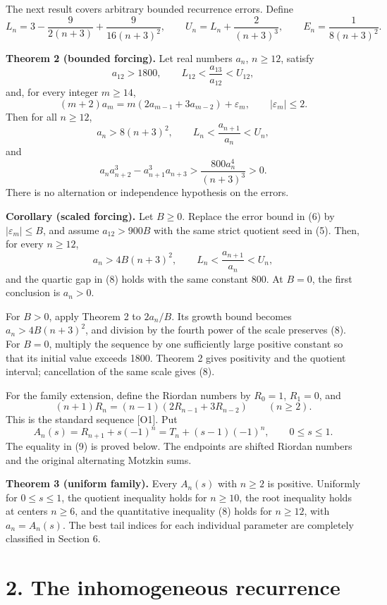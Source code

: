 \documentclass[
  11pt,
  a4paper,
]{article}
\begin{document}
The next result covers arbitrary bounded recurrence errors. Define \[
L_n=3-\frac9{2(n+3)}+\frac9{16(n+3)^2},\qquad
U_n=L_n+\frac2{(n+3)^3},\qquad E_n=\frac1{8(n+3)^2}.
\tag{4}
\]

\textbf{Theorem 2 (bounded forcing).} Let real numbers \(a_n\),
\(n\ge12\), satisfy \[
a_{12}>1800,\qquad L_{12}<\frac{a_{13}}{a_{12}}<U_{12},
\tag{5}
\] and, for every integer \(m\ge14\), \[
(m+2)a_m=m(2a_{m-1}+3a_{m-2})+\varepsilon_m,
\qquad |\varepsilon_m|\le2.
\tag{6}
\] Then for all \(n\ge12\), \[
a_n>8(n+3)^2,\qquad L_n<\frac{a_{n+1}}{a_n}<U_n,
\tag{7}
\] and \[
a_na_{n+2}^3-a_{n+1}^3a_{n+3}
>\frac{800a_n^4}{(n+3)^3}>0.
\tag{8}
\] There is no alternation or independence hypothesis on the errors.

\textbf{Corollary (scaled forcing).} Let \(B\ge0\). Replace the error
bound in (6) by \(|\varepsilon_m|\le B\), and assume \(a_{12}>900B\)
with the same strict quotient seed in (5). Then, for every \(n\ge12\),
\[
a_n>4B(n+3)^2,\qquad L_n<\frac{a_{n+1}}{a_n}<U_n,
\] and the quartic gap in (8) holds with the same constant 800. At
\(B=0\), the first conclusion is \(a_n>0\).

For \(B>0\), apply Theorem 2 to \(2a_n/B\). Its growth bound becomes
\(a_n>4B(n+3)^2\), and division by the fourth power of the scale
preserves (8). For \(B=0\), multiply the sequence by one sufficiently
large positive constant so that its initial value exceeds 1800. Theorem
2 gives positivity and the quotient interval; cancellation of the same
scale gives (8).

For the family extension, define the Riordan numbers by \(R_0=1\),
\(R_1=0\), and \[
(n+1)R_n=(n-1)(2R_{n-1}+3R_{n-2})\qquad(n\ge2).
\] This is the standard sequence {[}O1{]}. Put \[
A_n(s)=R_{n+1}+s(-1)^n=T_n+(s-1)(-1)^n,
\qquad 0\le s\le1.
\tag{9}
\] The equality in (9) is proved below. The endpoints are shifted
Riordan numbers and the original alternating Motzkin sums.

\textbf{Theorem 3 (uniform family).} Every \(A_n(s)\) with \(n\ge2\) is
positive. Uniformly for \(0\le s\le1\), the quotient inequality holds
for \(n\ge10\), the root inequality holds at centers \(n\ge6\), and the
quantitative inequality (8) holds for \(n\ge12\), with \(a_n=A_n(s)\).
The best tail indices for each individual parameter are completely
classified in Section 6.

\section{2. The inhomogeneous
recurrence}\label{the-inhomogeneous-recurrence}
\end{document}
